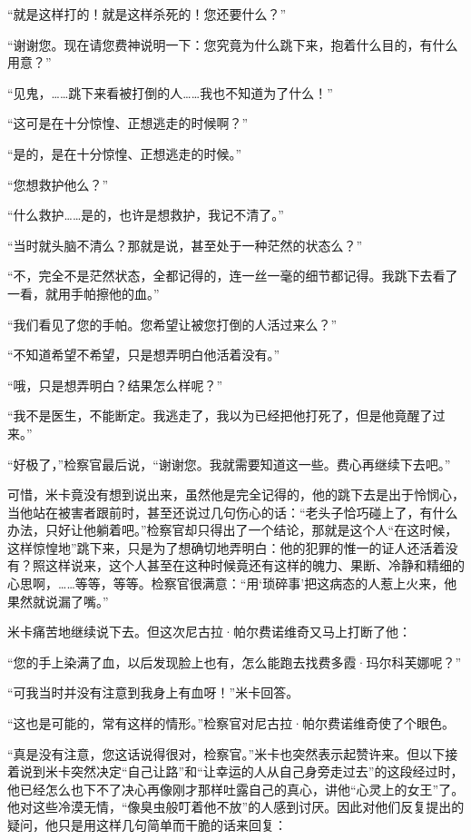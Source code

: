 \par “就是这样打的！就是这样杀死的！您还要什么？”
\par “谢谢您。现在请您费神说明一下：您究竟为什么跳下来，抱着什么目的，有什么用意？”
\par “见鬼，……跳下来看被打倒的人……我也不知道为了什么！”
\par “这可是在十分惊惶、正想逃走的时候啊？”
\par “是的，是在十分惊惶、正想逃走的时候。”
\par “您想救护他么？”
\par “什么救护……是的，也许是想救护，我记不清了。”
\par “当时就头脑不清么？那就是说，甚至处于一种茫然的状态么？”
\par “不，完全不是茫然状态，全都记得的，连一丝一毫的细节都记得。我跳下去看了一看，就用手帕擦他的血。”
\par “我们看见了您的手帕。您希望让被您打倒的人活过来么？”
\par “不知道希望不希望，只是想弄明白他活着没有。”
\par “哦，只是想弄明白？结果怎么样呢？”
\par “我不是医生，不能断定。我逃走了，我以为已经把他打死了，但是他竟醒了过来。”
\par “好极了，”检察官最后说，“谢谢您。我就需要知道这一些。费心再继续下去吧。”
\par 可惜，米卡竟没有想到说出来，虽然他是完全记得的，他的跳下去是出于怜悯心，当他站在被害者跟前时，甚至还说过几句伤心的话：“老头子恰巧碰上了，有什么办法，只好让他躺着吧。”检察官却只得出了一个结论，那就是这个人“在这时候，这样惊惶地”跳下来，只是为了想确切地弄明白：他的犯罪的惟一的证人还活着没有？照这样说来，这个人甚至在这种时候竟还有这样的魄力、果断、冷静和精细的心思啊，……等等，等等。检察官很满意：“用‘琐碎事’把这病态的人惹上火来，他果然就说漏了嘴。”
\par 米卡痛苦地继续说下去。但这次尼古拉·帕尔费诺维奇又马上打断了他：
\par “您的手上染满了血，以后发现脸上也有，怎么能跑去找费多霞·玛尔科芙娜呢？”
\par “可我当时并没有注意到我身上有血呀！”米卡回答。
\par “这也是可能的，常有这样的情形。”检察官对尼古拉·帕尔费诺维奇使了个眼色。
\par “真是没有注意，您这话说得很对，检察官。”米卡也突然表示起赞许来。但以下接着说到米卡突然决定“自己让路”和“让幸运的人从自己身旁走过去”的这段经过时，他已经怎么也下不了决心再像刚才那样吐露自己的真心，讲他“心灵上的女王”了。他对这些冷漠无情，“像臭虫般叮着他不放”的人感到讨厌。因此对他们反复提出的疑问，他只是用这样几句简单而干脆的话来回复：
